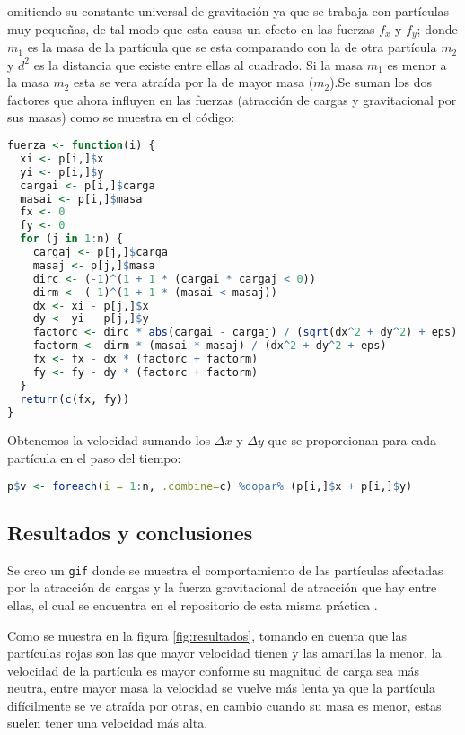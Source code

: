 \documentclass{article}
\begin{document}
omitiendo su constante universal de gravitaci\'on ya que se trabaja con part\'iculas muy peque\~nas, de tal modo que esta causa un efecto en las fuerzas $f_x$ y $f_y$; donde $m_1$ es la masa de la part\'icula que se esta comparando con la de otra part\'icula $m_2$ y $d^2$ es la distancia que existe entre ellas al cuadrado. Si la masa $m_1$ es menor a la masa $m_2$ esta se vera atra\'ida por la de mayor masa ($m_2$).Se suman los dos factores que ahora influyen en las fuerzas (atracci\'on de cargas y gravitacional por sus masas) como se muestra en el c\'odigo:

\newpage

\begin{lstlisting}[language=R]
fuerza <- function(i) {
  xi <- p[i,]$x
  yi <- p[i,]$y
  cargai <- p[i,]$carga
  masai <- p[i,]$masa
  fx <- 0
  fy <- 0
  for (j in 1:n) {
    cargaj <- p[j,]$carga
    masaj <- p[j,]$masa
    dirc <- (-1)^(1 + 1 * (cargai * cargaj < 0))
    dirm <- (-1)^(1 + 1 * (masai < masaj))
    dx <- xi - p[j,]$x
    dy <- yi - p[j,]$y
    factorc <- dirc * abs(cargai - cargaj) / (sqrt(dx^2 + dy^2) + eps)
    factorm <- dirm * (masai * masaj) / (dx^2 + dy^2 + eps)
    fx <- fx - dx * (factorc + factorm)
    fy <- fy - dy * (factorc + factorm)
  }
  return(c(fx, fy))
}
\end{lstlisting}

Obtenemos la velocidad sumando los $\Delta x$ y $\Delta y$ que se proporcionan para cada part\'icula en el paso del tiempo:

\begin{lstlisting}[language=R]
p$v <- foreach(i = 1:n, .combine=c) %dopar% (p[i,]$x + p[i,]$y)
\end{lstlisting}

\subsection{Resultados y conclusiones}

Se creo un \texttt{gif} donde se muestra el comportamiento de las part\'iculas afectadas por la atracci\'on de cargas y la fuerza gravitacional de atracci\'on que hay entre ellas, el cual se encuentra en el repositorio de esta misma pr\'actica \cite{repo}.

Como se muestra en la figura \ref{fig:resultados}, tomando en cuenta que las part\'iculas rojas son las que mayor velocidad tienen y las amarillas la menor, la velocidad de la part\'icula es mayor conforme su magnitud de carga sea m\'as neutra, entre mayor masa la velocidad se vuelve m\'as lenta ya que la part\'icula dif\'icilmente se ve atra\'ida por otras, en cambio cuando su masa es menor, estas suelen tener una velocidad m\'as alta.

\newpage





\end{document}
